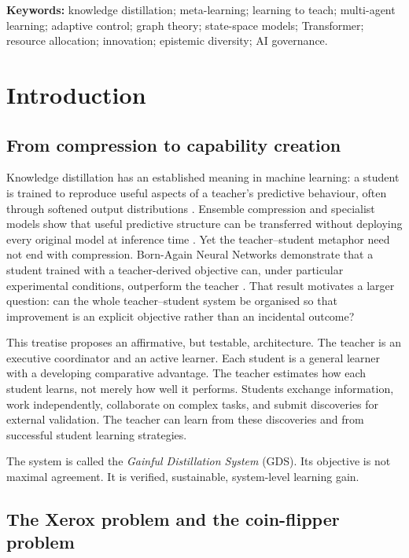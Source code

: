 \documentclass[11pt,a4paper]{article}
\begin{document}
\noindent\textbf{Keywords:} knowledge distillation; meta-learning; learning to teach; multi-agent learning; adaptive control; graph theory; state-space models; Transformer; resource allocation; innovation; epistemic diversity; AI governance.

\tableofcontents
\newpage

\section{Introduction}

\subsection{From compression to capability creation}

Knowledge distillation has an established meaning in machine learning: a student is trained to reproduce useful aspects of a teacher's predictive behaviour, often through softened output distributions \cite{hinton2015,bucilua2006}. Ensemble compression and specialist models show that useful predictive structure can be transferred without deploying every original model at inference time \cite{hinton2015}. Yet the teacher--student metaphor need not end with compression. Born-Again Neural Networks demonstrate that a student trained with a teacher-derived objective can, under particular experimental conditions, outperform the teacher \cite{furlanello2018}. That result motivates a larger question: can the whole teacher--student system be organised so that improvement is an explicit objective rather than an incidental outcome?

This treatise proposes an affirmative, but testable, architecture. The teacher is an executive coordinator and an active learner. Each student is a general learner with a developing comparative advantage. The teacher estimates how each student learns, not merely how well it performs. Students exchange information, work independently, collaborate on complex tasks, and submit discoveries for external validation. The teacher can learn from these discoveries and from successful student learning strategies.

The system is called the \emph{Gainful Distillation System} (GDS). Its objective is not maximal agreement. It is verified, sustainable, system-level learning gain.

\subsection{The Xerox problem and the coin-flipper problem}
\end{document}

